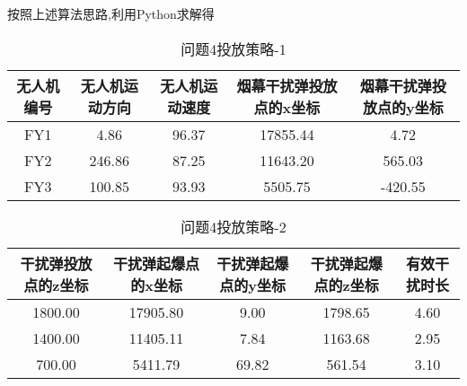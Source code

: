 \documentclass[../main.tex]{subfiles}
\begin{document}






按照上述算法思路,利用Python求解得

\begin{table}[H]
\caption{问题4投放策略-1}
\label{tab:001} 
\centering
\begin{small}
\begin{tabular}{ccccc}
\toprule[1.5pt]
无人机编号 &无人机运动方向 & 无人机运动速度  & 烟幕干扰弹投放点的x坐标& 烟幕干扰弹投放点的y坐标 \\
\midrule[1pt]
FY1 & 4.86             &  96.37                    & 17855.44                    & 4.72     \\            
FY2 & 246.86           &  87.25                    & 11643.20                    & 565.03      \\           
FY3 & 100.85           &  93.93                    & 5505.75                    & -420.55      \\           
\bottomrule[1.5pt]
\end{tabular}
\end{small}
\end{table}

\begin{table}[H]
\caption{问题4投放策略-2}
\label{tab:031} 
\centering
\begin{small}
\begin{tabular}{ccccc}
\toprule[1.5pt]
    干扰弹投放点的z坐标 &干扰弹起爆点的x坐标&干扰弹起爆点的y坐标&干扰弹起爆点的z坐标&有效干扰时长\\
\midrule[1pt]
1800.00             & 17905.80                 & 9.00     & 1798.65                    & 4.60  \\               
1400.00             & 11405.11                 & 7.84     & 1163.68                    & 2.95  \\               
700.00              & 5411.79                  & 69.82    & 561.54                    & 3.10  \\                
\bottomrule[1.5pt]
\end{tabular}
\end{small}
\end{table}
\end{document}
